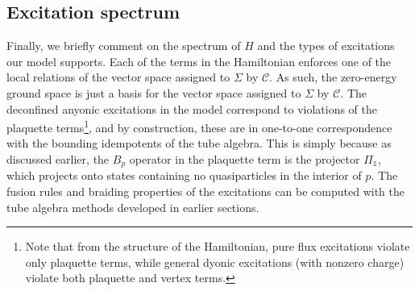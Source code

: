 \documentclass[12pt,a4paper]{article}
\newcommand{\unit}{\mathds{1}}
\newcommand{\mcc}{\mathcal{C}}
\newcommand{\dave}[1]{{\color{ao(english)}\footnotesize{(DA) #1}}}
\begin{document}
\subsection{Excitation spectrum} \label{excitations_of_H}

Finally, we briefly comment on the spectrum of $H$ and the types of excitations our model supports. 
Each of the terms in the Hamiltonian enforces one of the local relations of the vector space assigned to $\Sigma$ by $\mcc$. 
As such, the zero-energy ground space is just a basis for the vector space assigned to $\Sigma$ by $\mcc$.
The deconfined anyonic excitations in the model correspond to violations of the plaquette terms\footnote{Note that from the structure of the Hamiltonian, pure flux excitations violate only plaquette terms, while general dyonic excitations (with nonzero charge) violate both plaquette and vertex terms.}, and
by construction, these are in one-to-one correspondence with the bounding idempotents of the tube algebra. 
This is simply because as discussed earlier, the $B_p$ operator in the plaquette term is the projector $\Pi_\unit$, which projects onto states containing no quasiparticles in the interior of $p$. 
The fusion rules and braiding properties of the excitations can be computed with the tube algebra methods developed in earlier sections. 
\end{document}
